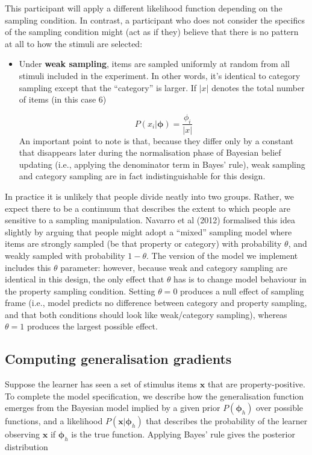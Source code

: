 \documentclass[
  english,
  doc]{apa6}
\begin{document}
\noindent  
This participant will apply a different likelihood function depending on the sampling condition. In contrast, a participant who does not consider the specifics of the sampling condition might (act as if they) believe that there is no pattern at all to how the stimuli are selected:

\begin{itemize}
\item
  Under \textbf{weak sampling}, items are sampled uniformly at random from all stimuli included in the experiment. In other words, it's identical to category sampling except that the \enquote{category} is larger. If \(|x|\) denotes the total number of items (in this case 6)

  \[
  P(x_i | \bm{\phi}) = \frac{\phi_i}{|x|}
  \]
  An important point to note is that, because they differ only by a constant that disappears later during the normalisation phase of Bayesian belief updating (i.e., applying the denominator term in Bayes' rule), weak sampling and category sampling are in fact indistinguishable for this design.
\end{itemize}

\noindent
In practice it is unlikely that people divide neatly into two groups. Rather, we expect there to be a continuum that describes the extent to which people are sensitive to a sampling manipulation. Navarro et al (2012) formalised this idea slightly by arguing that people might adopt a \enquote{mixed} sampling model where items are strongly sampled (be that property or category) with probability \(\theta\), and weakly sampled with probability \(1-\theta\). The version of the model we implement includes this \(\theta\) parameter: however, because weak and category sampling are identical in this design, the only effect that \(\theta\) has is to change model behaviour in the property sampling condition. Setting \(\theta = 0\) produces a null effect of sampling frame (i.e., model predicts no difference between category and property sampling, and that both conditions should look like weak/category sampling), whereas \(\theta = 1\) produces the largest possible effect.

\hypertarget{computing-generalisation-gradients}{%
\subsection{Computing generalisation gradients}\label{computing-generalisation-gradients}}

\noindent
Suppose the learner has seen a set of stimulus items \(\bm x\) that are property-positive. To complete the model specification, we describe how the generalisation function emerges from the Bayesian model implied by a given prior \(P(\bm{\phi}_h)\) over possible functions, and a likelihood \(P(\bm x | \bm{\phi}_h)\) that describes the probability of the learner observing \(\bm x\) if \(\bm{\phi}_h\) is the true function. Applying Bayes' rule gives the posterior distribution
\end{document}
